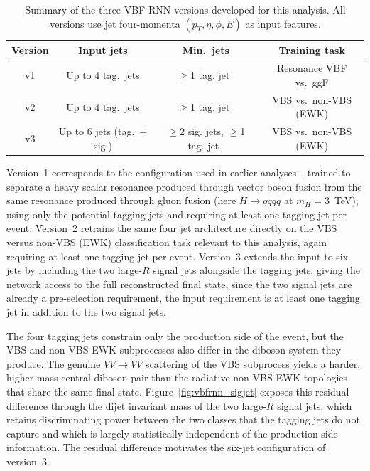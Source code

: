 \begin{table}[htbp]
  \centering
  \caption{Summary of the three VBF-RNN versions developed for this analysis. All versions use jet four-momenta $(p_T, \eta, \phi, E)$ as input features.}
  \label{tab:vbfrnn_versions}
  \begin{tabular}{|c|c|c|c|}
    \hline
    \textbf{Version} & \textbf{Input jets} & \textbf{Min.\ jets} & \textbf{Training task} \\
    \hline
    v1 & Up to 4 tag.\ jets            & $\geq$1 tag. jet\          & Resonance VBF vs.\ ggF \\
    v2 & Up to 4 tag.\ jets            & $\geq$1 tag. jet\          & VBS vs.\ non-VBS (EWK) \\
    v3 & Up to 6 jets (tag.\ + sig.)  & $\geq$2 sig. jets, $\geq$1 tag. jet\ & VBS vs.\ non-VBS (EWK) \\
    \hline
  \end{tabular}
\end{table}

Version~1 corresponds to the configuration used in earlier analyses~\cite{Antonio_VBFRNN_2023}, trained to separate a heavy scalar resonance produced through vector boson fusion from the same resonance produced through gluon fusion (here $H\to q\bar{q}q\bar{q}$ at $m_H = 3$~TeV), using only the potential tagging jets and requiring at least one tagging jet per event. Version~2 retrains the same four jet architecture directly on the VBS versus non-VBS (EWK) classification task relevant to this analysis, again requiring at least one tagging jet per event. Version~3 extends the input to six jets by including the two large-$R$ signal jets alongside the tagging jets, giving the network access to the full reconstructed final state, since the two signal jets are already a pre-selection requirement, the input requirement is at least one tagging jet in addition to the two signal jets.

The four tagging jets constrain only the production side of the event, but the VBS and non-VBS EWK subprocesses also differ in the diboson system they produce. The genuine $VV\to VV$ scattering of the VBS subprocess yields a harder, higher-mass central diboson pair than the radiative non-VBS EWK topologies that share the same final state. Figure~\ref{fig:vbfrnn_sigjet} exposes this residual difference through the dijet invariant mass of the two large-$R$ signal jets, which retains discriminating power between the two classes that the tagging jets do not capture and which is largely statistically independent of the production-side information. The residual difference motivates the six-jet configuration of version~3.

